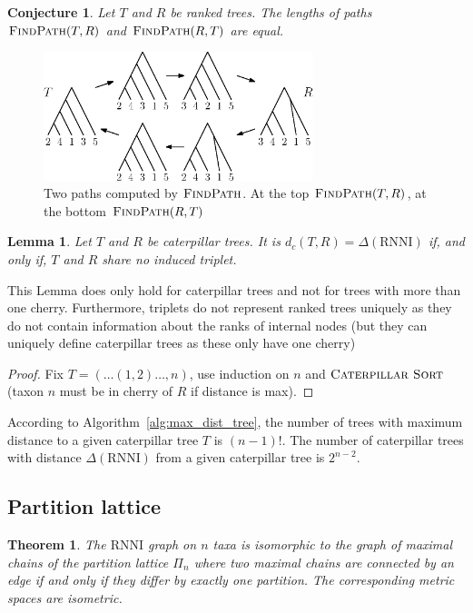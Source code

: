 \documentclass{amsart}
\newcommand{\rnni}{\mathrm{RNNI}}
\newcommand{\csort}{\textsc{Caterpillar Sort}}
\newcommand{\findpath}{\textsc{FindPath}}
\newtheorem{theorem}[definition]{Theorem}
\newtheorem{conjecture}[definition]{Conjecture}
\newtheorem{lemma}[definition]{Lemma}
\begin{document}
\begin{conjecture}
Let $T$ and $R$ be ranked trees.
The lengths of paths $\findpath(T,R)$ and $\findpath(R,T)$ are equal.
\end{conjecture}

\begin{figure}[H]
\centering
\includegraphics[width=0.7\textwidth]{findpath_not_symmetric}
\vspace{12pt}
\caption{Two paths computed by $\findpath$. At the top $\findpath(T,R)$, at the bottom $\findpath(R,T)$}
\label{fig:findpath_not_symmetric}
\end{figure}

\begin{lemma}
Let $T$ and $R$ be caterpillar trees.
It is $d_c(T,R) = \Delta(\rnni)$ if, and only if, $T$ and $R$ share no induced triplet.
\end{lemma}

This Lemma does only hold for caterpillar trees and not for trees with more than one cherry.
Furthermore, triplets do not represent ranked trees uniquely as they do not contain information about the ranks of internal nodes (but they can uniquely define caterpillar trees as these only have one cherry)

\begin{proof}
Fix $T = (\ldots(1,2) \ldots ,n)$, use induction on $n$ and $\csort$ (taxon $n$ must be in cherry of $R$ if distance is max).
\end{proof}

According to Algorithm~\ref{alg:max_dist_tree}, the number of trees with maximum distance to a given caterpillar tree $T$ is $(n-1)!$.
The number of caterpillar trees with distance $\Delta(\rnni)$ from a given caterpillar tree is $2^{n-2}$.


\subsection{Partition lattice}


\begin{theorem}
The $\rnni$ graph on $n$ taxa is isomorphic to the graph of maximal chains of the partition lattice $\Pi_n$ where two maximal chains are connected by an edge if and only if they differ by exactly one partition.
The corresponding metric spaces are isometric.
\end{theorem}


\printbibliography
\end{document}
